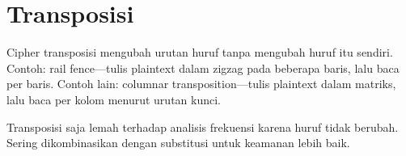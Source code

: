 \section{Transposisi}

Cipher transposisi mengubah urutan huruf tanpa mengubah huruf itu sendiri. Contoh: rail fence---tulis plaintext dalam zigzag pada beberapa baris, lalu baca per baris. Contoh lain: columnar transposition---tulis plaintext dalam matriks, lalu baca per kolom menurut urutan kunci.

Transposisi saja lemah terhadap analisis frekuensi karena huruf tidak berubah. Sering dikombinasikan dengan substitusi untuk keamanan lebih baik.
